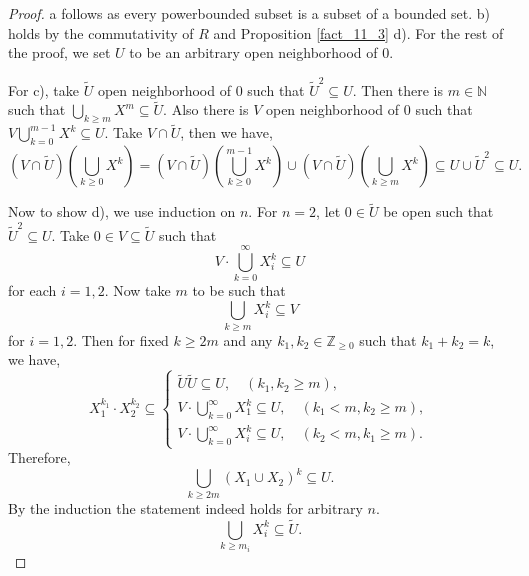 \documentclass[8pt]{article}
\numberwithin{equation}{section}
\begin{document}
\begin{proof}
    a follows as every powerbounded subset is a subset of a bounded set. b) holds by the commutativity of $R$ and Proposition \ref{fact_11_3} d). For the rest of the proof, we set $U$ to be an arbitrary open neighborhood of $0$.
    \par For c), take $\tilde{U}$ open neighborhood of $0$ such that $\tilde{U}^2\subseteq U$. Then there is $m\in\mathbb{N}$ such that $\bigcup_{k\geq m}X^m\subseteq \tilde{U}$. Also there is $V$ open neighborhood of $0$ such that $V\bigcup_{k=0}^{m-1}X^k\subseteq U$. Take $V\cap\tilde{U}$, then we have,
    \begin{equation*}
        (V\cap \tilde{U})\left(\bigcup_{k\geq0}X^k\right) = (V\cap\tilde{U})\left(\bigcup_{k\geq0}^{m-1}X^k\right)\cup(V\cap \tilde{U})\left(\bigcup_{k\geq m} X^k\right) \subseteq U\cup \tilde{U}^2\subseteq U.
    \end{equation*}
    \par Now to show d), we use induction on $n$. For $n=2$, let $0\in\tilde{U}$ be open such that $\tilde{U}^2\subseteq U$. Take $0\in V\subseteq\tilde{U}$ such that 
    \begin{equation*}
        V\cdot\bigcup_{k=0}^\infty X_i^k\subseteq U
    \end{equation*}
    for each $i=1,2$. Now take $m$ to be such that 
    \begin{equation*}
        \bigcup_{k\geq m}X_i^k\subseteq V
    \end{equation*}
    for $i=1,2$. Then for fixed $k\geq 2m$ and any $k_1,k_2\in\mathbb{Z}_{\geq0}$ such that $k_1+k_2 = k$, we have,
    \begin{equation*}
        X_1^{k_1}\cdot X_2^{k_2} \subseteq \begin{cases}
            \tilde{U}\tilde{U}\subseteq U,\quad(k_1,k_2\geq m),\\
            V\cdot\bigcup_{k=0}^\infty X_1^k\subseteq U,\quad(k_1<m,k_2\geq m),\\
            V\cdot\bigcup_{k=0}^\infty X_i^k\subseteq U,\quad(k_2<m,k_1\geq m).
        \end{cases}
    \end{equation*}
    Therefore,
    \begin{equation*}
        \bigcup_{k\geq 2m}(X_1\cup X_2)^k \subseteq U.
    \end{equation*}
    By the induction the statement indeed holds for arbitrary $n$.
    \begin{equation*}
        \bigcup_{k\geq m_i}X_i^k \subseteq\tilde{U}.

\end{equation*}
\end{proof}
\end{document}
